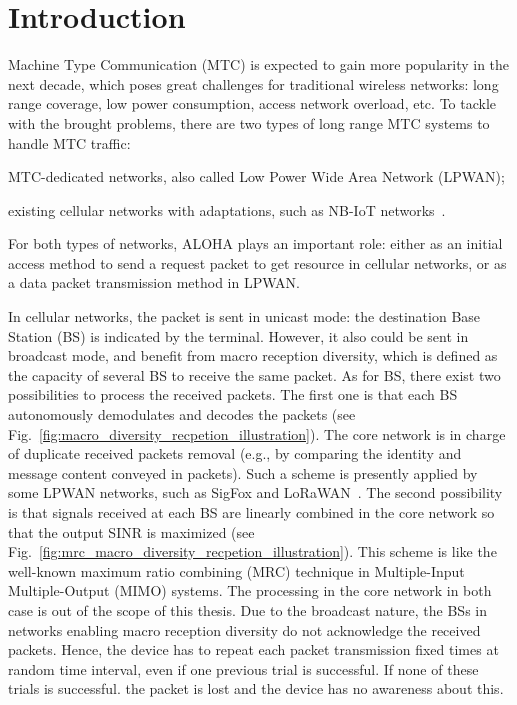 \section{Introduction}
Machine Type Communication (MTC) is expected to gain more popularity in the next decade, which poses great challenges for traditional wireless networks: long range coverage,  low power consumption, access network overload, etc. To tackle with the brought problems,
there are two types of long range MTC systems to handle MTC traffic:\begin{inparaenum}[1)]
 	\item MTC-dedicated networks, also called Low Power Wide Area Network (LPWAN);
 	\item existing cellular networks with adaptations, such as NB-IoT networks~\cite{goursaud2015dedicated}\cite{song2016survey}.
 \end{inparaenum}
For both types of networks, ALOHA plays an important role: either as an initial access method to send a request packet to get resource in cellular networks, or as a data packet transmission method in LPWAN. 

In cellular networks, the packet is sent in unicast mode: the destination Base Station (BS) is indicated by the terminal. However, it also could be sent in broadcast mode, and benefit from macro reception diversity, which is defined as the capacity of several BS to receive the same packet. As for BS, there exist two possibilities to process the received packets. The first one is that each BS autonomously demodulates and decodes the packets (see Fig.~\ref{fig:macro_diversity_recpetion_illustration}). The core network is in charge of duplicate received packets removal (e.g., by comparing the identity and message content conveyed in packets). Such a scheme is presently applied by some LPWAN networks, such as SigFox and LoRaWAN~\cite{ietf-lpwan-overview-03}. The second possibility is that signals received at each BS are linearly combined in the core network so that the output SINR is maximized (see Fig.~\ref{fig:mrc_macro_diversity_recpetion_illustration}). This scheme is like the well-known maximum ratio combining (MRC) technique in Multiple-Input Multiple-Output (MIMO) systems. The processing in the core network in both case is out of the scope of this thesis. 
Due to the broadcast nature, the BSs in networks enabling macro reception diversity do not acknowledge the received packets. Hence, the device has to repeat each packet transmission fixed times at random time interval, even if one previous trial is successful. If none of these trials is successful. the packet is lost and the device has no awareness about this.

